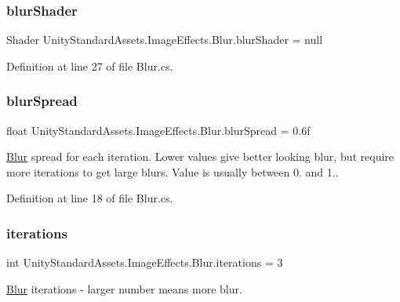 \subsubsection{\texorpdfstring{blur\+Shader}{blurShader}}
{\footnotesize\ttfamily Shader Unity\+Standard\+Assets.\+Image\+Effects.\+Blur.\+blur\+Shader = null}



Definition at line 27 of file Blur.\+cs.

\mbox{\label{class_unity_standard_assets_1_1_image_effects_1_1_blur_a6e904a33ffd2d23536a1a118566f8aad}} 
\subsubsection{\texorpdfstring{blur\+Spread}{blurSpread}}
{\footnotesize\ttfamily float Unity\+Standard\+Assets.\+Image\+Effects.\+Blur.\+blur\+Spread = 0.\+6f}

\mbox{\hyperlink{class_unity_standard_assets_1_1_image_effects_1_1_blur}{Blur}} spread for each iteration. Lower values give better looking blur, but require more iterations to get large blurs. Value is usually between 0. and 1.. 

Definition at line 18 of file Blur.\+cs.

\mbox{\label{class_unity_standard_assets_1_1_image_effects_1_1_blur_ab2609005fc43ef0b62eb286caccccc87}} 
\subsubsection{\texorpdfstring{iterations}{iterations}}
{\footnotesize\ttfamily int Unity\+Standard\+Assets.\+Image\+Effects.\+Blur.\+iterations = 3}



\mbox{\hyperlink{class_unity_standard_assets_1_1_image_effects_1_1_blur}{Blur}} iterations -\/ larger number means more blur. 



